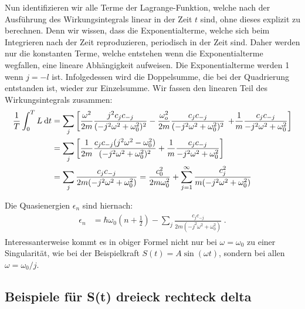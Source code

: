    Nun identifizieren wir alle Terme der Lagrange-Funktion, welche nach der Ausführung des Wirkungsintegrals linear in der Zeit $t$ sind, ohne dieses explizit zu berechnen.
   Denn wir wissen, dass die Exponentialterme, welche sich beim Integrieren nach der Zeit reproduzieren, periodisch in der Zeit sind.
   Daher werden nur die konstanten Terme, welche entstehen wenn die Exponentialterme wegfallen, eine lineare Abhängigkeit aufweisen.
   Die Exponentialterme werden 1 wenn $j=-l$ ist.
   Infolgedessen wird die Doppelsumme, die bei der Quadrierung entstanden ist, wieder zur Einzelsumme.
   Wir fassen den linearen Teil des Wirkungsintegrals zusammen:
   \begin{align}
     \begin{split}
       \frac{1}{T} \int_0^T L \: \text d t
       &= \sum_j \left[\frac{\omega^2}{2m} \frac{j^2c_jc_{-j}}{(-j^2\omega^2+\omega_0^2)^2}
       - \frac{\omega_o^2}{2m} \frac{c_jc_{-j}}{(-j^2\omega^2+\omega_0^2)^2} \right.
       \left. +\frac{1}{m} \frac{c_jc_{-j}}{-j^2\omega^2+\omega_0^2}
       \right]\\
       &= \sum_j \left[\frac{1}{2m} \frac{c_jc_{-j}(j^2\omega^2-\omega_0^2)}{(-j^2\omega^2+\omega_0^2)^2} + \frac{1}{m} \frac{c_jc_{-j}}{-j^2\omega^2+\omega_0^2} \right] \\
       &= \sum_j \frac{c_jc_{-j}}{2m(-j^2\omega^2+\omega_0^2)} = \frac{c_0^2}{2m\omega_0^2} + \sum_{j=1}^\infty \frac{c_j^2}{m(-j^2\omega^2+\omega_0^2)}
     \end{split}
   \end{align}

   Die Quasienergien $\epsilon_n$ sind hiernach:
   \begin{align}
     \begin{split}
       \epsilon_n &= \hbar \omega_0\left(n+\frac{1}{2}\right) - \sum_j \frac{c_jc_{-j}}{2m(-j^2\omega^2+\omega_0^2)} \; .
     \end{split}
   \end{align}
   Interessanterweise kommt es in obiger Formel nicht nur bei $\omega = \omega_0$ zu einer Singularität, wie bei der Beispielkraft $S(t) = A\sin(\omega t)$, sondern bei allen $\omega = \omega_0 / j$.



   \subsection{Beispiele für S(t) dreieck rechteck delta}

